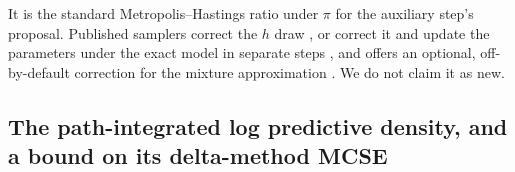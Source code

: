 It is the standard Metropolis--Hastings ratio under $\pi$ for the auxiliary step's proposal.
Published samplers correct the $h$ draw \citep{delnegro2015time}, or correct it and update the
parameters under the exact model in separate steps \citep{hosszejni2019approaches}, and
 offers an optional, off-by-default correction for the mixture approximation
\citep{hosszejni2021modeling}. We do not claim it as new.

\subsection{The path-integrated log predictive density, and a bound on its delta-method
MCSE}\label{app:mcse-bound}

